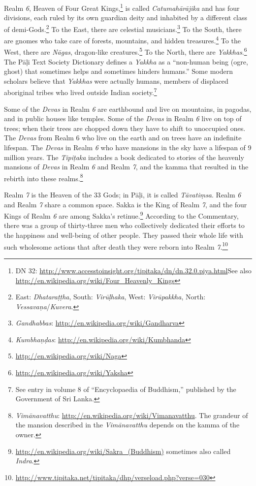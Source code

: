 \pagebreak

Realm \textit{6}, Heaven of Four Great Kings,\footnote{DN 32: \url{http://www.accesstoinsight.org/tipitaka/dn/dn.32.0.piya.html}\newline See also \url{http://en.wikipedia.org/wiki/Four_Heavenly_Kings}} is called \textit{Catumahārājika} and has four divisions, each ruled by its own guardian deity and inhabited by a different class of demi-Gods.\footnote{East: \textit{Dhataraṭṭha}, South: \textit{Virūḷhaka}, West: \textit{Virūpakkha}, North: \textit{Vessavaṇa}/\textit{Kuvera}.} To the East, there are celestial musicians.\footnote{\textit{Gandhabbas}: \url{http://en.wikipedia.org/wiki/Gandharva}} To the South, there are gnomes who take care of forests, mountains, and hidden treasures.\footnote{\textit{Kumbhaṇḍas}: \url{http://en.wikipedia.org/wiki/Kumbhanda}} To the West, there are \textit{Nāgas}, dragon-like creatures.\footnote{\url{http://en.wikipedia.org/wiki/Naga}} To the North, there are \textit{Yakkhas}.\footnote{\url{http://en.wikipedia.org/wiki/Yaksha}} The Pāḷi Text Society Dictionary defines a \textit{Yakkha} as a “non-human being (ogre, ghost) that sometimes helps and sometimes hinders humans.” Some modern scholars believe that \textit{Yakkhas} were actually humans, members of displaced aboriginal tribes who lived outside Indian society.\footnote{See entry in volume 8 of “Encyclopaedia of Buddhism,” published by the Government of Sri Lanka.}

Some of the \textit{Devas} in Realm \textit{6} are earthbound and live on mountains, in pagodas, and in public houses like temples. Some of the \textit{Devas} in Realm \textit{6} live on top of trees; when their trees are chopped down they have to shift to unoccupied ones. The \textit{Devas} from Realm 6 who live on the earth and on trees have an indefinite lifespan. The \textit{Devas} in Realm \textit{6} who have mansions in the sky have a lifespan of 9 million years. The \textit{Tipiṭaka} includes a book dedicated to stories of the heavenly mansions of \textit{Devas} in Realm \textit{6} and Realm \textit{7}, and the kamma that resulted in the rebirth into these realms.\footnote{\textit{Vimānavatthu}: \url{http://en.wikipedia.org/wiki/Vimanavatthu}. The grandeur of the mansion described in the \textit{Vimānavatthu} depends on the kamma of the owner.}

Realm \textit{7} is the Heaven of the 33 Gods; in Pāḷi, it is called \textit{Tāvatiṃsa}. Realm \textit{6} and Realm \textit{7} share a common space. Sakka is the King of Realm \textit{7}, and the four Kings of Realm \textit{6} are among Sakka’s retinue.\footnote{\url{http://en.wikipedia.org/wiki/Sakra_(Buddhism)} sometimes also called \textit{Indra}.} According to the Commentary, there was a group of thirty-three men who collectively dedicated their efforts to the happiness and well-being of other people. They passed their whole life with such wholesome actions that after death they were reborn into Realm \textit{7}.\footnote{\url{http://www.tipitaka.net/tipitaka/dhp/verseload.php?verse=030}}

